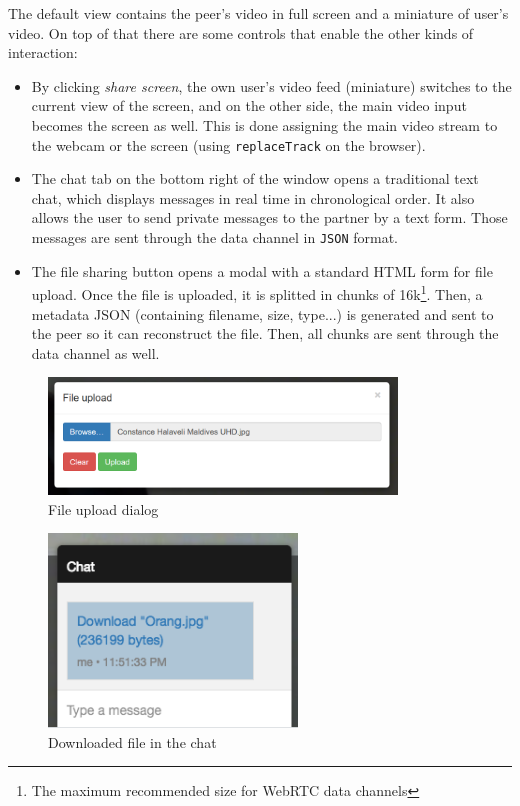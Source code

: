 \documentclass[paper=a4, fontsize=11pt]{scrartcl} %
\numberwithin{equation}{section} %
\numberwithin{figure}{section} %
\numberwithin{table}{section} %
\begin{document}
The default view contains the peer's video in full screen and a miniature of user's video. On top of that there are some controls that enable the other kinds of interaction:

\begin{itemize}
	\item By clicking \textit{share screen}, the own user's video feed (miniature) switches to the current view of the screen, and on the other side, the main video input becomes the screen as well. This is done assigning the main video stream to the webcam or the screen (using \verb|replaceTrack| on the browser).
	\item The chat tab on the bottom right of the window opens a traditional text chat, which displays messages in real time in chronological order. It also allows the user to send private messages to the partner by a text form. Those messages are sent through the data channel in \verb|JSON| format.
	\item The file sharing button opens a modal with a standard HTML form for file upload. Once the file is uploaded, it is splitted in chunks of 16k\footnote{The maximum recommended size for WebRTC data channels}. Then, a metadata JSON (containing filename, size, type...) is generated and sent to the peer so it can reconstruct the file. Then, all chunks are sent through the data channel as well.
\end{itemize}

\begin{figure}[ht!]
	\centering
	\includegraphics[width=350px]{file-upload.png}
	\caption{File upload dialog}
\end{figure}

\begin{figure}[ht!]
	\centering
	\includegraphics[width=250px]{file-download.png}
	\caption{Downloaded file in the chat}
\end{figure}
\end{document}
